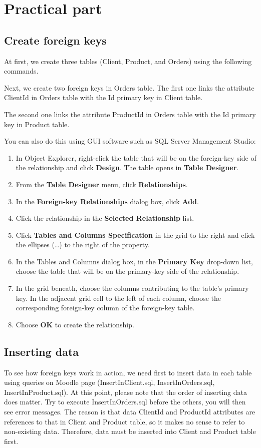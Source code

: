 \documentclass[10pt,a4paper]{article}
\begin{document}
\section{Practical part}
\subsection{Create foreign keys}
At first, we create three tables (Client, Product, and Orders) using the following commands.



Next, we create two foreign keys in Orders table. The first one links the attribute ClientId in Orders table with the Id primary key in Client table.

The second one links the attribute ProductId in Orders table with the Id primary key in Product table.

You can also do this using GUI software such as SQL Server Management Studio:
\begin{enumerate}
	\item In Object Explorer, right-click the table that will be on the foreign-key side of the relationship and click \textbf{Design}. The table opens in \textbf{Table Designer}.
	\item From the \textbf{Table Designer} menu, click \textbf{Relationships}.
	\item In the \textbf{Foreign-key Relationships} dialog box, click \textbf{Add}. 
	\item Click the relationship in the \textbf{Selected Relationship} list. 
	\item Click \textbf{Tables and Columns Specification} in the grid to the right and click the ellipses (…) to the right of the property.
	\item In the Tables and Columns dialog box, in the \textbf{Primary Key} drop-down list, choose the table that will be on the primary-key side of the relationship. 
	\item In the grid beneath, choose the columns contributing to the table's primary key. In the adjacent grid cell to the left of each column, choose the corresponding foreign-key column of the foreign-key table. 
	\item Choose \textbf{OK} to create the relationship.
\end{enumerate}
\subsection{Inserting data}
To see how foreign keys work in action, we need first to insert data in each table using queries on Moodle page (InsertInClient.sql, InsertInOrders.sql, InsertInProduct.sql). At this point, please note that the order of inserting data does matter. Try to execute InsertInOrders.sql before the others, you will then see error messages. The reason is that data ClientId and ProductId attributes are references to that in Client and Product table, so it makes no sense to refer to non-existing data. Therefore, data must be inserted into Client and Product table first.
\end{document}

